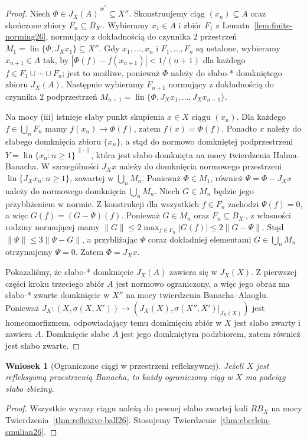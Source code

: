 \documentclass[11pt,a4paper]{article}
\numberwithin{equation}{section}
\theoremstyle{plain}
\newtheorem{wniosek}[twierdzenie]{Wniosek}
\theoremstyle{definition}
\theoremstyle{remark}
\DeclareMathOperator{\lin}{lin}
\begin{document}
\begin{proof}
Niech $\Phi\in\overline{J_X(A)}^{\,w^\ast}\subseteq X''$.
Skonstruujemy ciąg $(x_n)\subseteq A$ oraz skończone
zbiory $F_n\subseteq B_{X'}$. Wybieramy $x_1\in A$ i zbiór
$F_1$ z Lematu~\ref{lem:finite-norming26}, normujący z dokładnością
do czynnika $2$ przestrzeń
$M_1=\lin\{\Phi,J_Xx_1\}\subseteq X''$.
Gdy $x_1,\ldots,x_n$ i $F_1,\ldots,F_n$ są ustalone,
wybieramy $x_{n+1}\in A$ tak, by
$|\Phi(f)-f(x_{n+1})|<1/(n+1)$ dla każdego
$f\in F_1\cup\cdots\cup F_n$; jest to możliwe, ponieważ
$\Phi$ należy do słabo-* domkniętego zbioru $J_X(A)$.
Następnie wybieramy $F_{n+1}$ normujący z dokładnością
do czynnika $2$ podprzestrzeń
$M_{n+1}=\lin\{\Phi,J_Xx_1,\ldots,J_Xx_{n+1}\}$.

Na mocy (iii) istnieje słaby punkt skupienia $x\in X$
ciągu $(x_n)$. Dla każdego $f\in\bigcup_nF_n$ mamy
$f(x_n)\to\Phi(f)$, zatem $f(x)=\Phi(f)$.
Ponadto $x$ należy do słabego domknięcia zbioru
$\{x_n\}$, a stąd do normowo domkniętej podprzestrzeni
$Y=\overline{\lin\{x_n:n\ge1\}}^{\,\|\cdot\|}$,
która jest słabo domknięta na mocy twierdzenia Hahna--Banacha.
W szczególności $J_Xx$ należy do domknięcia normowego
przestrzeni $\lin\{J_Xx_n:n\ge1\}$, zawartej w
$\bigcup_nM_n$. Ponieważ $\Phi\in M_1$, również
$\Psi=\Phi-J_Xx$ należy do normowego domknięcia
$\bigcup_nM_n$. Niech $G\in M_n$ będzie jego
przybliżeniem w normie. Z konstrukcji dla wszystkich
$f\in F_n$ zachodzi $\Psi(f)=0$, a więc
$G(f)=(G-\Psi)(f)$.
Ponieważ $G\in M_n$ oraz $F_n\subseteq B_{X'}$,
z własności rodziny normującej mamy
$\|G\|\le2\max_{f\in F_n}|G(f)|\le2\|G-\Psi\|$.
Stąd $\|\Psi\|\le3\|\Psi-G\|$, a przybliżając
$\Psi$ coraz dokładniej elementami $G\in\bigcup_nM_n$
otrzymujemy $\Psi=0$. Zatem $\Phi=J_Xx$.

Pokazaliśmy, że słabo-* domknięcie $J_X(A)$ zawiera się
w $J_X(X)$. Z pierwszej części kroku trzeciego zbiór $A$
jest normowo ograniczony, a więc jego obraz ma słabo-* zwarte
domknięcie w $X''$ na mocy twierdzenia Banacha--Alaoglu.
Ponieważ $J_X:(X,\sigma(X,X'))\to
(J_X(X),\sigma(X'',X')|_{J_X(X)})$ jest homeomorfizmem,
odpowiadający temu domknięciu zbiór w $X$ jest słabo zwarty
i zawiera $A$. Domknięcie słabe $A$ jest jego domkniętym
podzbiorem, zatem również jest słabo zwarte.
\end{proof}

\begin{wniosek}[Ograniczone ciągi w przestrzeni refleksywnej]
\label{cor:bounded-subsequence26}
Jeżeli $X$ jest refleksywną przestrzenią Banacha,
to każdy ograniczony ciąg w $X$ ma podciąg słabo zbieżny.
\end{wniosek}
\begin{proof}
Wszystkie wyrazy ciągu należą do pewnej słabo zwartej kuli
$RB_X$ na mocy Twierdzenia~\ref{thm:reflexive-ball26}.
Stosujemy Twierdzenie~\ref{thm:eberlein-smulian26}.
\end{proof}
\end{document}
